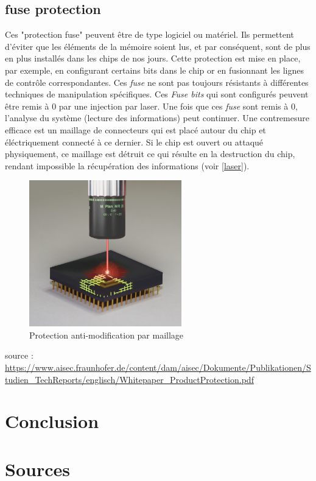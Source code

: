 \documentclass[12pt]{article}
\begin{document}
\subsection{fuse protection}
Ces "protection fuse" peuvent être de type logiciel ou matériel. Ils permettent d'éviter que les éléments de la mémoire soient lus, et par conséquent, sont de plus en plus installés dans les chips de nos jours. Cette protection est mise en place, par exemple, en configurant certains bits dans le chip or en fusionnant les lignes de contrôle correspondantes. Ces \textit{fuse} ne sont pas toujours résistants à différentes techniques de manipulation spécifiques. Ces \textit{Fuse bits} qui sont configurés peuvent être remis à 0 par une injection par laser. Une fois que ces \textit{fuse} sont remis à 0, l'analyse du système (lecture des informations) peut continuer. Une contremesure efficace est un maillage de connecteurs qui est placé autour du chip et éléctriquement connecté à ce dernier. Si le chip est ouvert ou attaqué physiquement, ce maillage est détruit ce qui résulte en la destruction du chip, rendant impossible la récupération des informations (voir \autoref{laser}).

\begin{figure}[!h]
	\centering
	\includegraphics[width=250px]{laserattack.png}
	\caption{Protection anti-modification par maillage}
	\label{laser}
\end{figure}

source : \url{https://www.aisec.fraunhofer.de/content/dam/aisec/Dokumente/Publikationen/Studien_TechReports/englisch/Whitepaper_ProductProtection.pdf}

\newpage

\section{Conclusion}
\label{sec:conclusion}

\section{Sources}
\label{sec:sources}
\end{document}
